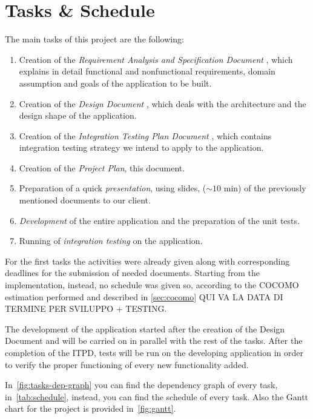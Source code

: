 \section{Tasks \& Schedule}

The main tasks of this project are the following:
\begin{enumerate}
    \item Creation of the \emph{Requirement Analysis and Specification Document} \cite{bib:rasd}, which explains in detail functional and nonfunctional requirements, domain assumption and goals of the application to be built.
    \item Creation of the \emph{Design Document} \cite{bib:dd}, which deals with the architecture and the design shape of the application.
    \item Creation of the \emph{Integration Testing Plan Document} \cite{bib:itpd}, which contains integration testing strategy we intend to apply to the application.
    \item Creation of the \emph{Project Plan}, this document.
    \item Preparation of a quick \emph{presentation}, using slides, ($\sim 10$ min) of the previously mentioned documents to our client.
    \item \emph{Development} of the entire application and the preparation of the unit tests.
    \item Running of \emph{integration testing} on the application.
\end{enumerate}

For the first tasks the activities were already given along with corresponding deadlines for the submission of needed documents. Starting from the implementation, instead, no schedule was given so, according to the COCOMO estimation performed and described in \ref{sec:cocomo} QUI VA LA DATA DI TERMINE PER SVILUPPO + TESTING. %

The development of the application started after the creation of the Design Document and will be carried on in parallel with the rest of the tasks.
After the completion of the ITPD, tests will be run on the developing application in order to verify the proper functioning of every new functionality added.

In~\autoref{fig:tasks-dep-graph} you can find the dependency graph of every task, in~\autoref{tab:schedule}, instead, you can find the schedule of every task. Also the Gantt chart for the project is provided in~\autoref{fig:gantt}.


